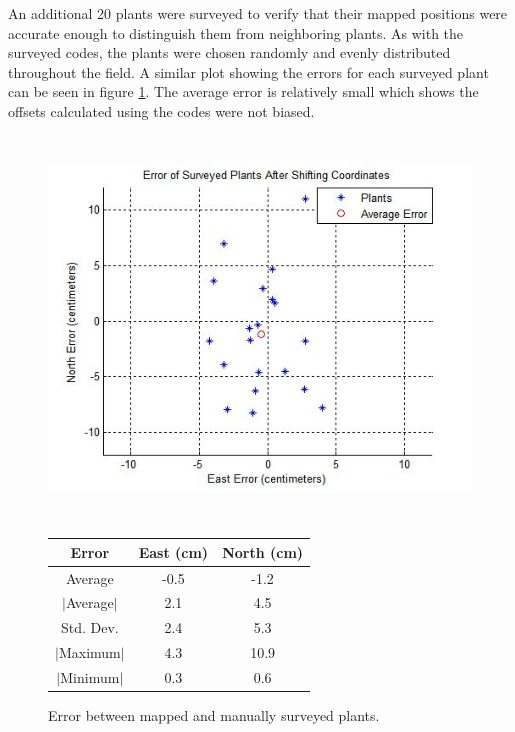 An additional 20 plants were surveyed to verify that their mapped positions were accurate enough to distinguish them from neighboring plants.  As with the surveyed codes, the plants were chosen randomly and evenly distributed throughout the field.   A similar plot showing the errors for each surveyed plant can be seen in figure \ref{figure:plant_errors}.  The average error is relatively small which shows the offsets calculated using the codes were not biased.   

  \begin{figure}
	\centering
    \includegraphics[height=4in]{figures/plant_errors.jpg}
    \newline
    \newline
    \centering
    \begin{tabular}[c]{|c|c|c|}
        \hline
        Error & East (cm) & North (cm) \\ 
        \hline
        Average   & -0.5 & -1.2           \\
        $|$Average$|$ & 2.1 & 4.5       \\
        Std. Dev. & 2.4 & 5.3       \\
        $|$Maximum$|$   & 4.3 & 10.9       \\
        $|$Minimum$|$   & 0.3 & 0.6       \\
        \hline
    \end{tabular}
    \captionsetup{labelformat=andtable}
    \caption[Errors in surveyed plants]{Error between mapped and manually surveyed plants.}
    \label{figure:plant_errors}
  \end{figure}

